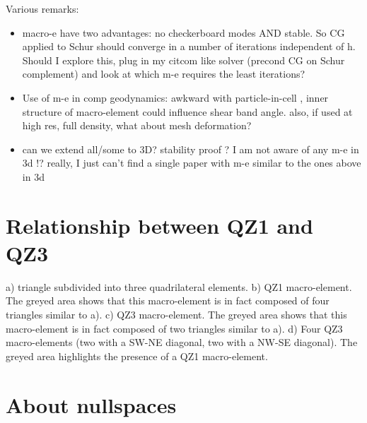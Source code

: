 \documentclass[a4paper,12pt]{article}
\begin{document}
Various remarks:
\begin{itemize}
\item
macro-e have two advantages: no checkerboard modes AND stable. 
So CG applied to Schur should converge in a number of iterations independent of h.
Should I explore this, plug in my citcom like solver (precond CG on Schur complement)
and look at which m-e requires the least iterations? 


\item 
Use of m-e in comp geodynamics: 
awkward with particle-in-cell , inner structure of macro-element could influence shear band angle. 
also, if used at high res, full density, what about mesh deformation?

\item can we extend all/some to 3D? stability proof ? I am not aware of any m-e in 3d !?
really, I just can't find a single paper with m-e similar to the ones above in 3d

\end{itemize}









\printbibliography

\appendix

\section{Relationship between QZ1 and QZ3}



a) triangle subdivided into three quadrilateral elements.
b) QZ1 macro-element. The greyed area shows that this macro-element is 
in fact composed of four triangles similar to a).
c) QZ3 macro-element. The greyed area shows that this macro-element is
in fact composed of two triangles similar to a).
d) Four QZ3 macro-elements (two with a SW-NE diagonal, two with a NW-SE diagonal).
The greyed area highlights the presence of a QZ1 macro-element. 


\newpage
\section{About nullspaces}
\end{document}
